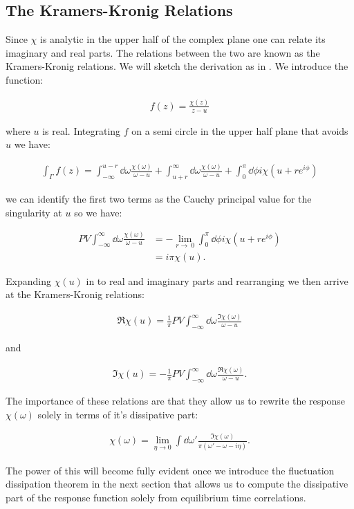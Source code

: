 \subsection{The Kramers-Kronig Relations}

Since $\chi$ is analytic in the upper half of the complex plane one can relate its imaginary and real parts. The relations between the two are known as the Kramers-Kronig relations. We will sketch the derivation as in \cite{Reichl1999}. We introduce the function:

\begin{align}
f(z) = \frac{\chi(z)}{z - u}
\end{align}

\noindent where $u$ is real. Integrating $f$ on a semi circle in the upper half plane that avoids $u$ we have:

\begin{align}
\int_{\Gamma} f(z) = \int_{- \infty}^{u-r} \dd \omega \frac{\chi(\omega)}{\omega - u} + \int_{u+r}^{\infty} \dd \omega \frac{\chi(\omega)}{\omega - u} + \int_{0}^{\pi} \dd \phi i \chi \left( u + re^{i\phi} \right)
\end{align}

\noindent we can identify the first two terms as the Cauchy principal value for the singularity at $u$ so we have:

\begin{align}
PV \int_{- \infty}^{\infty} \dd \omega \frac{\chi(\omega)}{\omega - u} &= - \lim_{r \to \ 0} \int_{0}^{\pi} \dd \phi i \chi \left( u + re^{i\phi} \right)\\
&= i \pi \chi(u).
\end{align}

Expanding $\chi(u)$ in to real and imaginary parts and rearranging we then arrive at the Kramers-Kronig relations:

\begin{align}
\Re{\chi(u)} = \frac{1}{\pi} PV \int_{- \infty}^{\infty} \dd \omega \frac{ \Im{\chi(\omega)} }{\omega - u} 
\end{align}

and

\begin{align}
\Im{\chi(u)} = - \frac{1}{\pi} PV \int_{- \infty}^{\infty} \dd \omega \frac{ \Re{\chi(\omega)} }{\omega - u}.
\end{align}

\noindent The importance of these relations are that they allow us to rewrite the response $\chi(\omega)$ solely in terms of it's dissipative part:

\begin{align}
\chi(\omega) = \lim_{\eta \to 0} \int \dd \omega' \frac{\Im{\chi(\omega)}}{\pi\left(\omega' - \omega - i \eta \right)}.
\end{align}

\noindent The power of this will become fully evident once we introduce the fluctuation dissipation theorem in the next section that allows us to compute the dissipative part of the response function solely from equilibrium time correlations.
